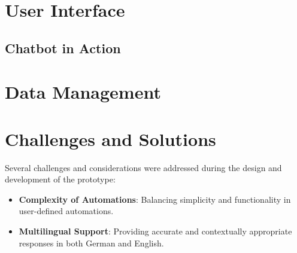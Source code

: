\section{User Interface}
\subsection{Chatbot in Action}
\section{Data Management}
\section{Challenges and Solutions}
Several challenges and considerations were addressed during the design and development of the prototype:

\begin{itemize}
\item \textbf{Complexity of Automations}: Balancing simplicity and functionality in user-defined automations.
\item \textbf{Multilingual Support}: Providing accurate and contextually appropriate responses in both German and English.
\end{itemize}
